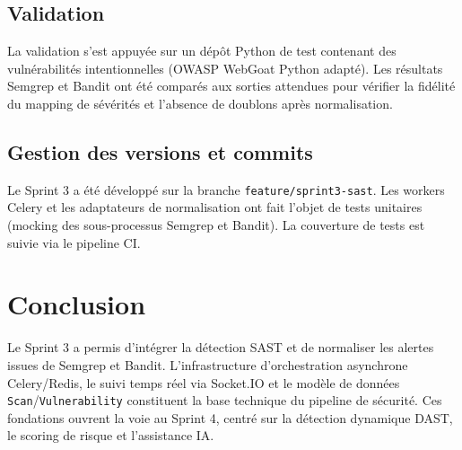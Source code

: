 \subsection{Validation}
La validation s'est appuyée sur un dépôt Python de test contenant des vulnérabilités intentionnelles (OWASP WebGoat Python adapté). Les résultats Semgrep et Bandit ont été comparés aux sorties attendues pour vérifier la fidélité du mapping de sévérités et l'absence de doublons après normalisation.

\subsection{Gestion des versions et commits}
Le Sprint 3 a été développé sur la branche \texttt{feature/sprint3-sast}. Les workers Celery et les adaptateurs de normalisation ont fait l'objet de tests unitaires (mocking des sous-processus Semgrep et Bandit). La couverture de tests est suivie via le pipeline CI.

\section{Conclusion}
Le Sprint 3 a permis d'intégrer la détection SAST et de normaliser les alertes issues de Semgrep et Bandit. L'infrastructure d'orchestration asynchrone Celery/Redis, le suivi temps réel via Socket.IO et le modèle de données \texttt{Scan}/\texttt{Vulnerability} constituent la base technique du pipeline de sécurité. Ces fondations ouvrent la voie au Sprint 4, centré sur la détection dynamique DAST, le scoring de risque et l'assistance IA.
